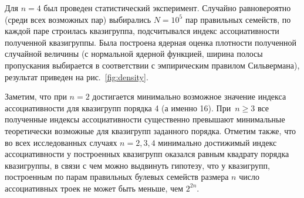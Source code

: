     Для $n = 4$ был проведен статистический эксперимент.
    Случайно равновероятно (среди всех возможных пар) выбирались $N = 10^5$ пар правильных семейств, по каждой паре строилась квазигруппа, подсчитывался индекс ассоциативности полученной квазигруппы.
    Была построена ядерная оценка плотности полученной случайной величины (с нормальной ядерной функцией, ширина полосы пропускания выбирается в соответствии с эмпирическим правилом Сильвермана), результат приведен на рис.~\ref{fig:density}.

    \begin{figure}[ht] %
    \end{figure}



    \begin{figure}[ht] %
    \end{figure}

    Заметим, что при $n = 2$ достигается минимально возможное значение индекса ассоциативности для квазигрупп порядка 4 (а именно 16).
    При~$n \ge 3$ все полученные индексы ассоциативности существенно превышают минимальные теоретически возможные для квазигрупп заданного порядка.
    Отметим также, что во всех исследованных случаях $n = 2, 3, 4$ минимально достижимый индекс ассоциативности у построенных квазигрупп оказался равным квадрату порядка квазигруппы, в связи с чем можно выдвинуть гипотезу, что у квазигрупп, построенным по парам правильных булевых семейств размера $n$ число ассоциативных троек не может быть меньше, чем $2^{2n}$.

    \begin{figure}[ht] %
    \end{figure}

